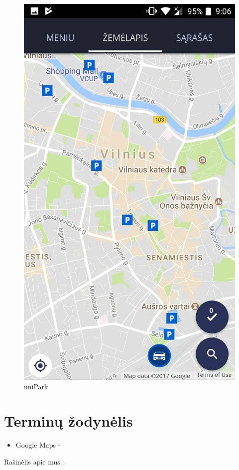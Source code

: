 \documentclass{VUMIFPSkursinis}
\begin{document}
\begin{enumerate}
\begin{samepage}
			\begin{figure}[H]
				\centering
				\includegraphics[scale=0.3]{img/unipark}
				\caption{uniPark}
				\label{img:unipark}
			\end{figure}
		\end{samepage}
\end{enumerate}

\section{Terminų žodynėlis}
\begin{itemize}
	\item Google Maps - 
\end{itemize}


Rašinėlis apie mus...
\end{document}
